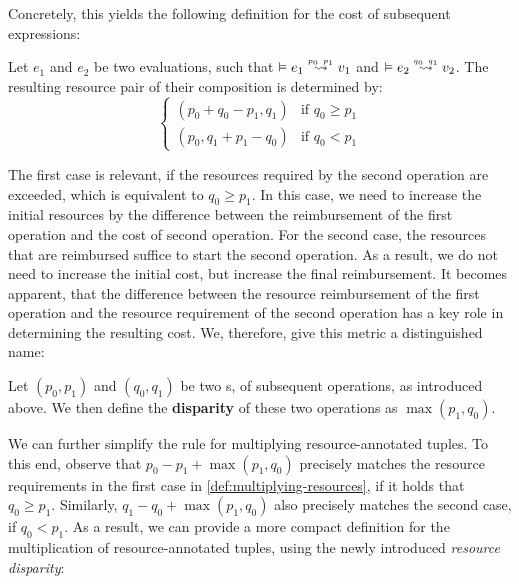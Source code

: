 Concretely, this yields the following definition for the cost of subsequent expressions:

\begin{definition}
   \label{def:multiplying-resources}
   Let \(e_1\) and \(e_2\) be two evaluations, such that \(\evals{}{e_1}{v_1}{p_0}{p_1}\) and \( \evals{}{e_2}{v_2}{q_0}{q_1}\). The resulting resource pair of their composition is determined by:
   \[
      \begin{cases}
         (p_0 + q_0 - p_1,  q_1) & \mbox{if } q_0 \geq p_1 \\
         (p_0,q_1 + p_1 - q_0) & \mbox{if } q_0 <    p_1 
      \end{cases}
   \]
\end{definition}

The first case is relevant, if the resources required by the second operation are exceeded, which is equivalent to \(q_0 \geq p_1\). In this case, we need to increase the initial resources by the difference between the reimbursement of the first operation and the cost of second operation. For the second case, the resources that are reimbursed suffice to start the second operation. As a result, we do not need to increase the initial cost, but increase the final reimbursement. It becomes apparent, that the difference between the resource reimbursement of the first operation and the resource requirement of the second operation has a key role in determining the resulting cost. We, therefore, give this metric a distinguished name:

\begin{definition} \label{def:resource-disparity}
   Let \((p_0, p_1)\) and \((q_0, q_1)\) be two s, of subsequent operations, as introduced above. We then define the \textbf{disparity} of these two operations as \(\max(p_1, q_0)\).
\end{definition}

We can further simplify the rule for multiplying resource-annotated tuples. To this end, observe that \(p_0 - p_1 + \max(p_1, q_0)\) precisely matches the resource requirements in the first case in \ref{def:multiplying-resources}, if it holds that \(q_0 \geq p_1\). Similarly, \(q_1 - q_0 + \max(p_1, q_0)\) also precisely matches the second case, if \(q_0 < p_1\). As a result, we can provide a more compact definition for the multiplication of resource-annotated tuples, using the newly introduced \emph{resource disparity}:


